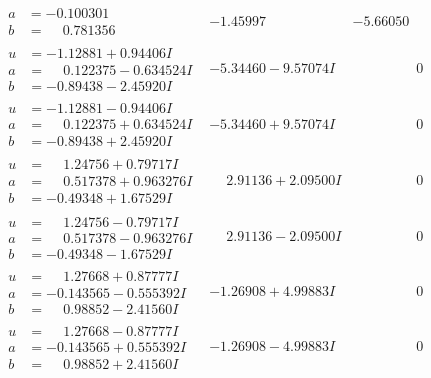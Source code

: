 \documentclass[1p]{elsarticle_modified}
\theoremstyle{definition}
\begin{document}
$$\begin{array}{c|c|c}
\begin{aligned}
a &= -0.100301\phantom{ +0.000000I} \\
b &= \phantom{-}0.781356\phantom{ +0.000000I}\end{aligned}
 & -1.45997\phantom{ +0.000000I} & -5.66050\phantom{ +0.000000I} \\ \hline\begin{aligned}
u &= -1.12881 + 0.94406 I \\
a &= \phantom{-}0.122375 - 0.634524 I \\
b &= -0.89438 - 2.45920 I\end{aligned}
 & -5.34460 - 9.57074 I & \phantom{-0.000000 } 0 \\ \hline\begin{aligned}
u &= -1.12881 - 0.94406 I \\
a &= \phantom{-}0.122375 + 0.634524 I \\
b &= -0.89438 + 2.45920 I\end{aligned}
 & -5.34460 + 9.57074 I & \phantom{-0.000000 } 0 \\ \hline\begin{aligned}
u &= \phantom{-}1.24756 + 0.79717 I \\
a &= \phantom{-}0.517378 + 0.963276 I \\
b &= -0.49348 + 1.67529 I\end{aligned}
 & \phantom{-}2.91136 + 2.09500 I & \phantom{-0.000000 } 0 \\ \hline\begin{aligned}
u &= \phantom{-}1.24756 - 0.79717 I \\
a &= \phantom{-}0.517378 - 0.963276 I \\
b &= -0.49348 - 1.67529 I\end{aligned}
 & \phantom{-}2.91136 - 2.09500 I & \phantom{-0.000000 } 0 \\ \hline\begin{aligned}
u &= \phantom{-}1.27668 + 0.87777 I \\
a &= -0.143565 - 0.555392 I \\
b &= \phantom{-}0.98852 - 2.41560 I\end{aligned}
 & -1.26908 + 4.99883 I & \phantom{-0.000000 } 0 \\ \hline\begin{aligned}
u &= \phantom{-}1.27668 - 0.87777 I \\
a &= -0.143565 + 0.555392 I \\
b &= \phantom{-}0.98852 + 2.41560 I\end{aligned}
 & -1.26908 - 4.99883 I & \phantom{-0.000000 } 0 \\ \hline\begin{aligned}

\end{aligned}
\end{array}$$
\end{document}

